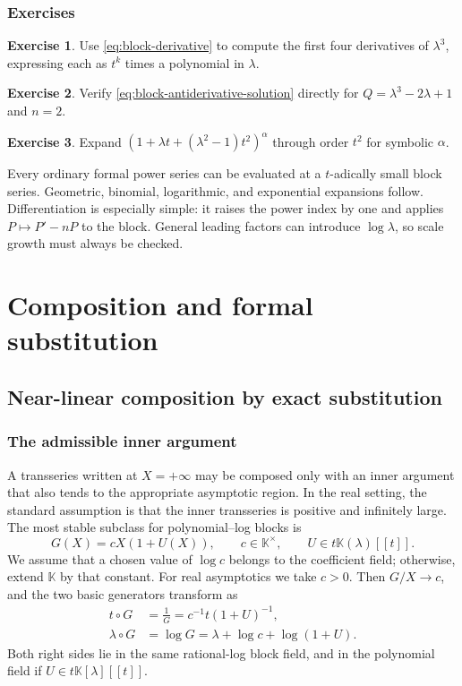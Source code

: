 \documentclass[11pt,openany]{book}
\theoremstyle{definition}
\newtheorem{exercise}{Exercise}[chapter]
\theoremstyle{plain}
\theoremstyle{remark}
\newcommand{\K}{\mathbb{K}}
\begin{document}
\section{Exercises}
\begin{exercise}
Use \cref{eq:block-derivative} to compute the first four derivatives of \(\lambda^3\), expressing each as \(t^k\) times a polynomial in \(\lambda\).
\end{exercise}
\begin{exercise}
Verify \cref{eq:block-antiderivative-solution} directly for \(Q=\lambda^3-2\lambda+1\) and \(n=2\).
\end{exercise}
\begin{exercise}
Expand \((1+\lambda t+(\lambda^2-1)t^2)^{\alpha}\) through order \(t^2\) for symbolic \(\alpha\).
\end{exercise}

\begin{summarybox}
Every ordinary formal power series can be evaluated at a \(t\)-adically small block series. Geometric, binomial, logarithmic, and exponential expansions follow. Differentiation is especially simple: it raises the power index by one and applies \(P\mapsto P'-nP\) to the block. General leading factors can introduce \(\log\lambda\), so scale growth must always be checked.
\end{summarybox}

\part{Composition and formal substitution}\label{part:composition}

\chapter{Near-linear composition by exact substitution}\label{ch:near-linear-composition}

\section{The admissible inner argument}
A transseries written at \(X=+\infty\) may be composed only with an inner argument that also tends to the appropriate asymptotic region. In the real setting, the standard assumption is that the inner transseries is positive and infinitely large. The most stable subclass for polynomial--log blocks is
\begin{equation}\label{eq:near-linear-G}
 G(X)=cX(1+U(X)),
 \qquad c\in\K^\times,
 \qquad U\in t\K(\lambda)[[t]].
\end{equation}
We assume that a chosen value of \(\log c\) belongs to the coefficient field; otherwise, extend \(\K\) by that constant. For real asymptotics we take \(c>0\). Then \(G/X\to c\), and the two basic generators transform as
\begin{align}
 t\circ G&=\frac1{G}
 =c^{-1}t(1+U)^{-1},\label{eq:t-compose-G}\\
 \lambda\circ G&=\log G
 =\lambda+\log c+\log(1+U).\label{eq:lambda-compose-G}
\end{align}
Both right sides lie in the same rational-log block field, and in the polynomial field if \(U\in t\K[\lambda][[t]]\).
\end{document}
